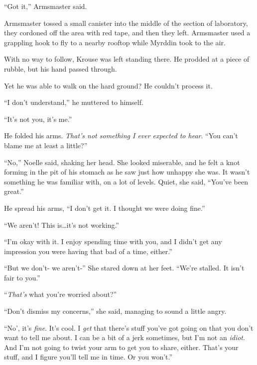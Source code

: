 ``Got it,'' Armsmaster said.



Armsmaster tossed a small canister into the middle of the section of laboratory, they cordoned off the area with red tape, and then they left.  Armsmaster used a grappling hook to fly to a nearby rooftop while Myrddin took to the air.  



With no way to follow, Krouse was left standing there.  He prodded at a piece of rubble, but his hand passed through.



Yet he was able to walk on the hard ground?  He couldn't process it.



``I don't understand,'' he muttered to himself.



``It's not you, it's me.''



He folded his arms.  \emph{That's not something I ever expected to hear}.  ``You can't blame me at least a little?''



``No,'' Noelle said, shaking her head.  She looked miserable, and he felt a knot forming in the pit of his stomach as he saw just how unhappy she was.  It wasn't something he was familiar with, on a lot of levels.  Quiet, she said, ``You've been great.''



He spread his arms, ``I don't get it.  I thought we were doing fine.''



``We aren't!  This is\ldots it's not working.''



``I'm okay with it.  I enjoy spending time with you, and I didn't get any impression you were having that bad of a time, either.''



``But we don't- we aren't-''  She stared down at her feet.  ``We're stalled.  It isn't fair to you.''



``\emph{That's} what you're worried about?''



``Don't dismiss my concerns,'' she said, managing to sound a little angry.



``No', it's \emph{fine}.  It's cool.  I \emph{get} that there's stuff you've got going on that you don't want to tell me about.  I can be a bit of a jerk sometimes, but I'm not an \emph{idiot}.  And I'm not going to twist your arm to get you to share, either.  That's your stuff, and I figure you'll tell me in time.  Or you won't.''



